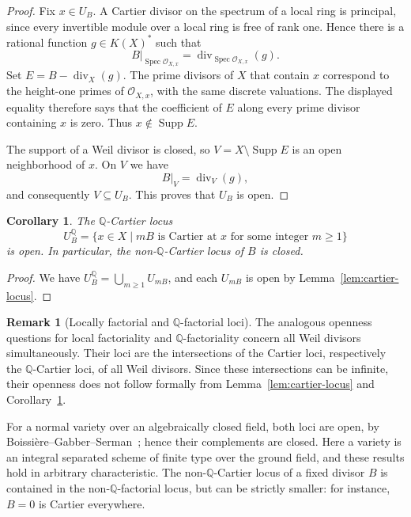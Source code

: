 \documentclass[11pt,a4paper]{article}
\newtheorem{corollary}[lemma]{Corollary}
\theoremstyle{definition}
\newtheorem{remark}[lemma]{Remark}
\theoremstyle{definition}
\DeclareMathOperator{\Spec}{Spec}
\DeclareMathOperator{\Supp}{Supp}
\newcommand{\OO}{\mathcal O}
\begin{document}
\begin{proof}
Fix $x\in U_B$. A Cartier divisor on the spectrum of a local ring is principal, since every invertible module over a local ring is free of rank one. Hence there is a rational function $g\in K(X)^*$ such that
\[
 B|_{\Spec\OO_{X,x}}
 =\operatorname{div}_{\Spec\OO_{X,x}}(g).
\]
Set $E=B-\operatorname{div}_X(g)$. The prime divisors of $X$ that contain $x$ correspond to the height-one primes of $\OO_{X,x}$, with the same discrete valuations. The displayed equality therefore says that the coefficient of $E$ along every prime divisor containing $x$ is zero. Thus $x\notin\Supp E$.

The support of a Weil divisor is closed, so $V=X\setminus\Supp E$ is an open neighborhood of $x$. On $V$ we have
\[
 B|_V=\operatorname{div}_V(g),
\]
and consequently $V\subseteq U_B$. This proves that $U_B$ is open.
\end{proof}

\begin{corollary}\label{cor:q-cartier-locus}
The $\mathbb Q$-Cartier locus
\[
 U_B^{\mathbb Q}
 =\{x\in X\mid mB\text{ is Cartier at }x
                 \text{ for some integer }m\ge1\}
\]
is open. In particular, the non-$\mathbb Q$-Cartier locus of $B$ is closed.
\end{corollary}

\begin{proof}
We have $U_B^{\mathbb Q}=\bigcup_{m\ge1}U_{mB}$, and each $U_{mB}$ is open by Lemma~\ref{lem:cartier-locus}.
\end{proof}

\begin{remark}[Locally factorial and $\mathbb Q$-factorial loci]
The analogous openness questions for local factoriality and $\mathbb Q$-factoriality concern all Weil divisors simultaneously. Their loci are the intersections of the Cartier loci, respectively the $\mathbb Q$-Cartier loci, of all Weil divisors. Since these intersections can be infinite, their openness does not follow formally from Lemma~\ref{lem:cartier-locus} and Corollary~\ref{cor:q-cartier-locus}.

For a normal variety over an algebraically closed field, both loci are open, by Boissi\`ere--Gabber--Serman~\cite[Theorems~4.2 and~6.1]{BGS}; hence their complements are closed. Here a variety is an integral separated scheme of finite type over the ground field, and these results hold in arbitrary characteristic. The non-$\mathbb Q$-Cartier locus of a fixed divisor $B$ is contained in the non-$\mathbb Q$-factorial locus, but can be strictly smaller: for instance, $B=0$ is Cartier everywhere.
\end{remark}
\end{document}
